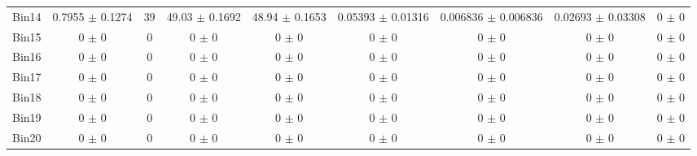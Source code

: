 \begin{tabular}{@{\extracolsep{4pt}}lcccccccc@{}}
     Bin14 & 0.7955 $\pm$ 0.1274 & 39 & 49.03 $\pm$ 0.1692 & 48.94 $\pm$ 0.1653 & 0.05393 $\pm$ 0.01316 & 0.006836 $\pm$ 0.006836 & 0.02693 $\pm$ 0.03308 & 0 $\pm$ 0 \\ 
     Bin15 & 0 $\pm$ 0 & 0 & 0 $\pm$ 0 & 0 $\pm$ 0 & 0 $\pm$ 0 & 0 $\pm$ 0 & 0 $\pm$ 0 & 0 $\pm$ 0 \\ 
     Bin16 & 0 $\pm$ 0 & 0 & 0 $\pm$ 0 & 0 $\pm$ 0 & 0 $\pm$ 0 & 0 $\pm$ 0 & 0 $\pm$ 0 & 0 $\pm$ 0 \\ 
     Bin17 & 0 $\pm$ 0 & 0 & 0 $\pm$ 0 & 0 $\pm$ 0 & 0 $\pm$ 0 & 0 $\pm$ 0 & 0 $\pm$ 0 & 0 $\pm$ 0 \\ 
     Bin18 & 0 $\pm$ 0 & 0 & 0 $\pm$ 0 & 0 $\pm$ 0 & 0 $\pm$ 0 & 0 $\pm$ 0 & 0 $\pm$ 0 & 0 $\pm$ 0 \\ 
     Bin19 & 0 $\pm$ 0 & 0 & 0 $\pm$ 0 & 0 $\pm$ 0 & 0 $\pm$ 0 & 0 $\pm$ 0 & 0 $\pm$ 0 & 0 $\pm$ 0 \\ 
     Bin20 & 0 $\pm$ 0 & 0 & 0 $\pm$ 0 & 0 $\pm$ 0 & 0 $\pm$ 0 & 0 $\pm$ 0 & 0 $\pm$ 0 & 0 $\pm$ 0 \\ 
\hline\hline
  \end{tabular}

